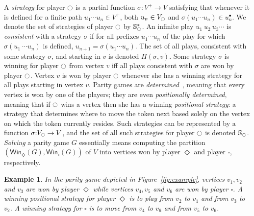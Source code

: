 \documentclass{eptcs}
\newtheorem{exam}{Example}
\newenvironment{example}{\begin{exam} \rm }{\end{exam}}
\newcommand{\plays}[2]{\Pi(#1,#2)}
\renewcommand{\i}{\ensuremath{\ocircle}\xspace}
\newcommand{\odd}{\ensuremath{\square}\xspace}
\newcommand{\even}{\ensuremath{\Diamond}\xspace}
\newcommand{\player}{\ensuremath{\ocircle}\xspace}
\newcommand{\post}[1]{\ensuremath{#1^{\bullet}}}
\newcommand{\winsubodd}[1]{\textsf{Win}_{\odd}(#1)}
\newcommand{\winsubeven}[1]{\textsf{Win}_{\even}(#1)}
\newcommand{\oftype}{{:}}
\newcommand{\strategy}[1]{\mathbb{S}_{#1}}
\newcommand{\memstrategy}[1]{\mathbb{S}_{#1}^*}
\begin{document}
A \emph{strategy} for player $\i$ is a partial function $\sigma
\oftype V^+ \to V$ satisfying that whenever it is defined for a
finite path $u_1 \cdots u_n \in V^+$, both $u_n \in V_{\i}$ and
$\sigma(u_1\cdots u_n) \in \post{u_n}$. We denote the set of
strategies of player $\player$ by $\memstrategy{\player}$.  
An infinite play $u_1\
u_2\ u_3 \cdots$ is \emph{consistent} with a strategy $\sigma$ if
for all prefixes $u_1 \cdots u_n$ of the play for which $\sigma(u_1\
\cdots u_n)$ is defined, $u_{n+1} = \sigma(u_1 \cdots u_n)$. The
set of all plays, consistent with some strategy $\sigma$, and starting
in $v$ is denoted $\plays{\sigma}{v}$. Some
strategy $\sigma$ is winning for player $\i$ from vertex $v$ iff
all plays consistent with $\sigma$ are won by player $\i$.  Vertex
$v$ is won by player $\i$ whenever she has a winning strategy for
all plays starting in vertex $v$.  Parity games are
\emph{determined}~\cite{EJ:91}, meaning that every vertex is won
by one of the players; they are even \emph{positionally determined},
meaning that if $\i$ wins a vertex then she has a winning
\emph{positional strategy}: a strategy that determines where to
move the token next based solely on the vertex on which the token
currently resides. Such strategies can be represented by a function
$\sigma\oftype V_{\i} \to V$, and the set of all such strategies for
player $\player$ is denoted $\strategy{\player}$.  \emph{Solving} a parity game $G$
essentially means computing the partition $(\winsubeven{G},\winsubodd{G})$
of $V$ into vertices won by player $\even$ and player $\odd$,
respectively.

\begin{example}
In the parity game depicted in Figure~\ref{fig:example}, vertices
$v_1, v_2$ and $v_3$ are won by player $\even$ while vertices $v_4, v_5$ and $v_6$ are
won by player $\odd$. A winning positional strategy for player $\even$
is to play from $v_2$ to $v_1$ and from $v_3$ to $v_2$. A winning
strategy for $\odd$ is to move from $v_4$ to $v_6$ and
from $v_5$ to $v_6$.
\end{example}
\end{document}
